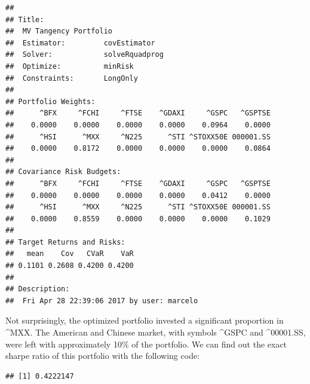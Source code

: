 \documentclass[11pt,]{book}
\newenvironment{Shaded}{\begin{snugshade}}{\end{snugshade}}
\newcommand{\KeywordTok}[1]{\textcolor[rgb]{0.27,0.27,0.27}{\textbf{#1}}}
\newcommand{\DataTypeTok}[1]{\textcolor[rgb]{0.27,0.27,0.27}{#1}}
\newcommand{\StringTok}[1]{\textcolor[rgb]{0.5,0.5,0.5}{#1}}
\newcommand{\CommentTok}[1]{\textcolor[rgb]{0.56,0.35,0.01}{\textit{#1}}}
\newcommand{\OperatorTok}[1]{\textcolor[rgb]{0.81,0.36,0.00}{\textbf{#1}}}
\newcommand{\NormalTok}[1]{#1}
\begin{document}
\begin{verbatim}
## 
## Title:
##  MV Tangency Portfolio 
##  Estimator:         covEstimator 
##  Solver:            solveRquadprog 
##  Optimize:          minRisk 
##  Constraints:       LongOnly 
## 
## Portfolio Weights:
##      ^BFX     ^FCHI     ^FTSE    ^GDAXI     ^GSPC   ^GSPTSE 
##    0.0000    0.0000    0.0000    0.0000    0.0964    0.0000 
##      ^HSI      ^MXX     ^N225      ^STI ^STOXX50E 000001.SS 
##    0.0000    0.8172    0.0000    0.0000    0.0000    0.0864 
## 
## Covariance Risk Budgets:
##      ^BFX     ^FCHI     ^FTSE    ^GDAXI     ^GSPC   ^GSPTSE 
##    0.0000    0.0000    0.0000    0.0000    0.0412    0.0000 
##      ^HSI      ^MXX     ^N225      ^STI ^STOXX50E 000001.SS 
##    0.0000    0.8559    0.0000    0.0000    0.0000    0.1029 
## 
## Target Returns and Risks:
##   mean    Cov   CVaR    VaR 
## 0.1101 0.2608 0.4200 0.4200 
## 
## Description:
##  Fri Apr 28 22:39:06 2017 by user: marcelo
\end{verbatim}

Not surprisingly, the optimized portfolio invested a significant
proportion in \^{}MXX. The American and Chinese market, with symbols
\^{}GSPC and \^{}00001.SS, were left with approximately 10\% of the
portfolio. We can find out the exact sharpe ratio of this portfolio with
the following code:

\begin{Shaded}
\end{Shaded}

\begin{verbatim}
## [1] 0.4222147
\end{verbatim}
\end{document}
